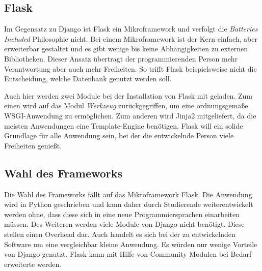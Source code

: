 \subsection{Flask}
Im Gegensatz zu Django ist Flask ein Mikroframework und verfolgt die \textit{Batteries Included} Philosophie nicht. Bei einem Mikroframework ist der Kern einfach, aber erweiterbar gestaltet und es gibt wenige bis keine Abhängigkeiten zu externen Bibliotheken. Dieser Ansatz übertragt der programmierenden Person mehr Verantwortung aber auch mehr Freiheiten. So trifft Flask beispielsweise nicht die Entscheidung, welche Datenbank genutzt werden soll. \cite{palletsForewordFlaskDocumentation2010} 

Auch hier werden zwei Module bei der Installation von Flask mit geladen. Zum einen wird auf das Modul \textit{Werkzeug} zurückgegriffen, um eine ordnungsgemäße WSGI-Anwendung zu ermöglichen. Zum anderen wird Jinja2 mitgeliefert, da die meisten Anwendungen eine Template-Engine benötigen.
Flask will ein solide Grundlage für alle Anwendung sein, bei der die entwickelnde Person viele Freiheiten genießt.\cite{palletsDesignDecisionsFlask2010}

\subsection{Wahl des Frameworks}

Die Wahl des Frameworks fällt auf das Mikroframework Flask. Die Anwendung wird in Python geschrieben und kann daher durch Studierende weiterentwickelt werden ohne, dass diese sich in eine neue Programmiersprachen einarbeiten müssen. Des Weiteren werden viele Module von Django nicht benötigt. Diese stellen einen Overhead dar. Auch handelt es sich bei der zu entwickelnden Software um eine vergleichbar kleine Anwendung. Es würden nur wenige Vorteile von Django genutzt. Flask kann mit Hilfe von Community Modulen bei Bedarf erweiterte werden.